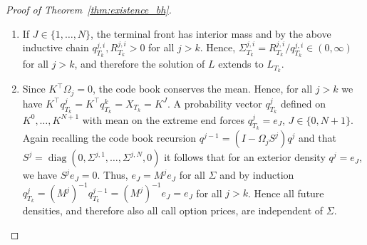 \documentclass[smallextended,envcountsame,envcountsect]{svjour3}
\DeclareMathOperator{\diag}{diag}
\begin{document}
\begin{proof}[Proof of Theorem~\ref{thm:existence_bh}]
\begin{enumerate}[label=(\roman*)]
  Next we show that a single zero-valued interior density node forces all interior nodes to be zero-valued. In contrast, a single positive-valued interior node spreads to all interior nodes. Abbreviate $p=q^{j-1}$, $q=q^j$, $R=R^j$ at time $\zeta$ and write out row $i$ of \eqref{eq:R_codebook_mw}: 
  \begin{equation*}
    p_i = q_i+( \gamma^{-i} + \gamma^{+i} ) R_i - \gamma^{ +(i-1)} R_{i-1} - \gamma^{ -(i+1)} R_{i+1}.
  \end{equation*}
  From Lemma~\ref{lem:zero_sets_bh} (b) we know that $q_i = 0$ iff $R_i = 0$. Hence, if $q_i = 0$, then also $R_i = 0$ and $p_i = - \gamma^{ +(i-1)} R_{i-1} - \gamma^{ -(i+1)} R_{i+1}$. The left-hand side, $p_i$, is non-negative and the right-hand side non-positive. Therefore $p_i = 0$ and $R_{i\pm1} = 0$ and again by Lemma~\ref{lem:zero_sets_bh} (b) $q_{i\pm1} = 0$. This argument spreads across the grid such that all interior nodes have to be equal to zero. Mass can only be attained on an outer node. Conversely, if $q^{j-1}$ has interior mass then the chain above cannot start and all $q^{j, i}$, and thus $R^{j, i}$, are positive. 

  Now, suppose that $\zeta < T_k$. Then the Brownian motion $B_\zeta$ is finite, and the front density $q^k_\zeta$ still has interior mass. Applying the above inductive chain for $j = k+1, \dots, M$ we obtain that $\Sigma^{j, i}_{\zeta-} = R^{j, i}_{\zeta-} / q_{\zeta-}^{j, i} \in (0, \infty)$. Hence, $L$ has a finite limit at $\zeta$ which means it could be extended to $\zeta$, contradicting the maximality of $\zeta$. Therefore $\zeta = T_k$, which proves existence. 
  

  \item If $J \in \lbrace 1, \dots, N \rbrace $, the terminal front has interior mass and by the above inductive chain $q^{j,i}_{T_k},R^{j,i}_{T_k}>0$ for all $j > k$. Hence, $\Sigma^{j, i}_{T_k} = R^{j, i}_{T_k} / q^{j, i}_{T_k} \in (0, \infty)$ for all $j > k$, and therefore the solution of $L$ extends to $L_{T_k}$. 
  
  \item Since $K^\top \Omega_j = 0$, the code book conserves the mean. Hence, for all $j > k$ we have $K^\top q^j_{T_k} = K^\top q^k_{T_k} = X_{T_k} = K^J$. A probability vector $q^{j}_{T_k}$ defined on $K^0, \dots, K^{N+1}$ with mean on the extreme end forces $q^j_{T_k} = e_J$, $J \in \lbrace 0, N+1 \rbrace$. Again recalling the code book recursion $q^{j-1} = (I - \Omega_j S^j) q^j$ and that $S^j = \diag(0, \Sigma^{j, 1}, \dots, \Sigma^{j, N}, 0)$ it follows that for an exterior density $q^j = e_J$, we have $S^j e_J = 0$. Thus, $e_J = M^j e_J$ for all $\Sigma$ and by induction $ q^{j}_{T_k} = (M^j)^{-1} q^{j-1}_{T_k} = (M^j)^{-1} e_J = e_J$ for all $j > k$. Hence all future densities, and therefore also all call option prices, are independent of $\Sigma$. 
\end{enumerate}
\end{proof}
\end{document}
